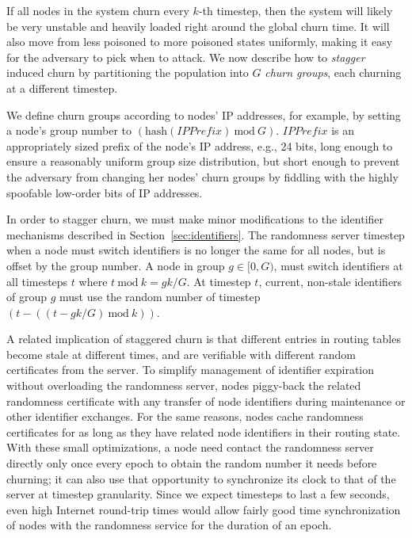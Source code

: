 \documentclass[10pt,twocolumn]{article}
\begin{document}
\label{sec:staggering}

If all nodes in the system churn every $k$-th timestep, then the system
will likely be very unstable and heavily loaded right around the global churn
time. It will also move from less poisoned to more poisoned
states uniformly, making it easy for the adversary to pick when to attack.
We now describe how to \emph{stagger} 
induced churn by partitioning the population into $G$
\emph{churn groups}, each churning at a different timestep.

We define churn groups according to nodes' IP addresses, for
example, by setting a node's group number to $(\mathrm{hash}(\mathit{IPPrefix})
\mathrm{\ mod\ } G)$.  $\mathit{IPPrefix}$ is an appropriately sized
prefix of the node's IP address, e.g., 24 bits, long enough to ensure a
reasonably uniform group size distribution, but short enough to prevent
the adversary from changing her nodes' churn groups by fiddling with the
highly spoofable low-order bits of IP addresses.

In order to stagger churn, we must make minor modifications to the
identifier mechanisms described in Section~\ref{sec:identifiers}.  The
randomness server timestep when a node must switch identifiers is no
longer the same for all nodes, but is offset by the group number.
A node in group $g \in [0, G)$, must switch identifiers at all timesteps $t$ where
$t \mathrm{\ mod\ } k = gk/G$.  At timestep $t$, current, non-stale
identifiers of group $g$ must use the random number of timestep $(t -
((t - gk/G) \mathrm{\ mod\ } k))$.

A related implication of staggered churn is that different entries in
routing tables become stale at different times, and are verifiable
with different random certificates from the server.  To simplify
management of identifier expiration without overloading the randomness
server, nodes piggy-back the related randomness certificate with any
transfer of node identifiers during maintenance or other
identifier exchanges.  For the same reasons, nodes cache randomness certificates
for as long as they have related node identifiers in their routing
state.  With these small optimizations, a node need contact the
randomness server directly only once every epoch to obtain
the random number it needs before churning; it can also use
that opportunity to synchronize its clock to that of the server at
timestep granularity.  Since we expect timesteps to last a few
seconds, even high Internet round-trip times would allow fairly good time
synchronization of nodes with the randomness service for the duration of
an epoch.
\end{document}
